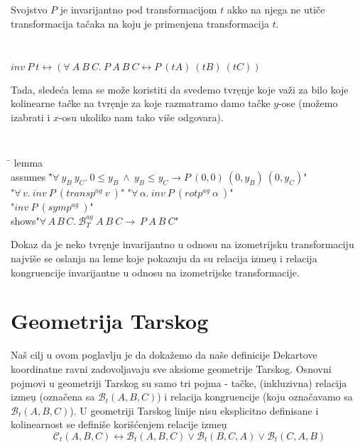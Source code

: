 \documentclass[a4paper, 12pt]{article}
\newcommand{\agbett}[3]{\ensuremath{\mathcal{B}_T^{\mathit{ag}}\ #1\ #2\ #3}}
\newcommand{\agtransp}[2]{\ensuremath{transp^{ag}\ #1\ #2}}
\newcommand{\agrotp}[2]{\ensuremath{rotp^{ag}\ #1\ #2}}
\newcommand{\agsymp}[1]{\ensuremath{symp^{ag}\ #1}}
\newcommand{\bett}[3]{\ensuremath{\mathcal{B}_t(#1, #2, #3)}}
\newcommand{\colint}[3]{\ensuremath{\mathcal{C}_t(#1, #2, #3)}}
\begin{document}
Svojstvo $P$ je invarijantno pod transformacijom $t$ akko na njega ne 
uti\v ce transformacija ta\v caka na koju je primenjena transformacija $t$.

{\tt
\begin{tabbing}
$inv\ P\ t \longleftrightarrow (\forall\ A\ B\ C.\ P\ A\ B\ C
\longleftrightarrow P\ (t A)\ (t B)\ (t C))$
\end{tabbing}
}

Tada, slede\'ca lema se mo\v ze koristiti da svedemo tvr\d enje 
koje va\v zi za bilo koje kolinearne ta\v cke na tvr\d enje za
koje razmatramo damo ta\v cke $y$-ose (mo\v zemo izabrati i $x$-osu
ukoliko nam tako vi\v se odgovara).


{\tt
\begin{tabbing}
\hspace{5mm}\=\kill
lemma\\
\>assumes \="$\forall\ y_B\ y_C.\ 0 \le y_B \ \wedge\  y_B \le y_C \longrightarrow P\ (0, 0)\ (0, y_B)\ (0, y_C)$"\\
\>\>       "$\forall\,v.\ inv\ P\ (\agtransp{v}{})$" "$\forall\,\alpha.\ inv\ P\ (\agrotp{\alpha}{})$"\\
\>\>       "$inv\ P\ (\agsymp{})$"\\
\>shows\>"$\forall\,A\,B\,C.\ \agbett{A}{B}{C} \longrightarrow\ P\
A\ B\ C$"
\end{tabbing}
}

Dokaz da je neko tvr\d enje invarijantno u odnosu na izometrijsku 
transformaciju najvi\v se se oslanja na leme koje pokazuju da su 
relacija izme\d u i relacija kongruencije invarijantne u odnosu
na izometrijske transformacije.

\section{Geometrija Tarskog}
\label{sec:tarski}

Na\v s cilj u ovom poglavlju je da doka\v zemo da na\v se definicije 
Dekartove koordinatne ravni zadovoljavaju sve aksiome geometrije Tarskog\cite{tarski}.
Osnovni pojmovi u geometriji Tarskog su samo tri pojma - ta\v cke,
(inkluzivna) relacija izme\d u (ozna\v cena sa $\bett{A}{B}{C}$) i relacija kongruencije (koju ozna\v cavamo sa
 $\bett{A}{B}{C}$). U geometriji Tarskog linije nisu eksplicitno definisane i
kolinearnost se defini\v se kori\v s\'cenjem relacije izme\d u
$$\colint{A}{B}{C} \longleftrightarrow \bett{A}{B}{C} \vee \bett{B}{C}{A} \vee \bett{C}{A}{B}$$
\end{document}
